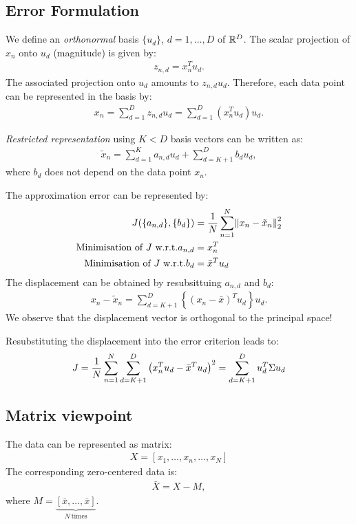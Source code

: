 \subsection{Error Formulation}
We define an \emph{orthonormal} basis $\{u_d\}$, $d=1,\ldots, D$ of $\mathbb{R}^D$. The scalar projection of $x_n$ onto $u_d$ (magnitude) is given by:
\begin{align*}
    z_{n,d} = x_n^Tu_d.
\end{align*}
The associated projection onto $u_d$ amounts to $z_{n,d}u_d$. Therefore, each data point can be represented in the basis by:
\begin{align*}
    x_n = \sum_{d=1}^D z_{n,d}u_d=\sum_{d=1}^D\left(x_n^Tu_d\right) u_d.
\end{align*}

\emph{Restricted representation} using $K<D$ basis vectors can be written as:
\begin{align*}
\tilde x_n = \sum_{d=1}^K a_{n,d}u_d + \sum_{d=K+1}^D b_d u_d,
\end{align*}
where $b_d$ does not depend on the data point $x_n$.

The approximation error can be represented by:
\begin{align*}
 J(\{a_{n,d}\}, \{ b_d\}) &= {1\over N} \sum_{n=1}^N \norm{x_n-\tilde x_n}_2^2\\
\text{Minimisation of $J$ w.r.t.} a_{n,d} &= x_n^T\\
\text{Minimisation of $J$ w.r.t.} b_d &= \bar x^T u_d
\end{align*}
The displacement can be obtained by resubsittuing $a_{n,d}$ and $b_d$:
\begin{align*}
x_n - \tilde x_n = \sum_{d=K+1}^D \left\{\left(x_n-\bar x\right)^Tu_d\right\}u_d.
\end{align*}
We observe that the displacement vector is orthogonal to the principal space!

Resubstituting the displacement into the error criterion leads to:
\begin{align*}
    J= {1\over N} \sum_{n=1}^N \sum_{d=K+1}^D \left(x_n^T u_d - \bar x^T u_d\right)^2 = \sum_{d=K+1}^D u_d^T \Sigma u_d
\end{align*}

\subsection{Matrix viewpoint}
The data can be represented as matrix:
\begin{align*}
    X= [x_1,\ldots, x_n,\ldots, x_N]
\end{align*}
The corresponding zero-centered data is:
\begin{align*}
    \bar X = X-M,
\end{align*}
where $M=\underbrace{[\bar x, \ldots, \bar x]}_{N\ \text{times}}$.

